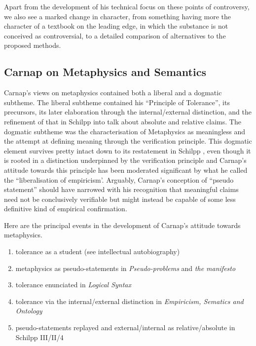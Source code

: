 \documentclass[10pt,titlepage]{book}
\begin{document}
Apart from the development of his technical focus on these points of controversy, we also see a marked change in character, from something having more the character of a textbook on the leading edge, in which the substance is not conceived as controversial, to a detailed comparison of alternatives to the proposed methods.

\subsection{Carnap on Metaphysics and Semantics}

Carnap's views on metaphysics contained both a liberal and a dogmatic subtheme.
The liberal subtheme contained his ``Principle of Tolerance'', its precursors, its later elaboration through the internal/external distinction, and the refinement of that in Schilpp\cite{carnap63a} into talk about absolute and relative claims.
The dogmatic subtheme was the characterisation of Metaphysics as meaningless and the attempt at defining meaning through the verification principle.
This dogmatic element survives pretty intact down to its restatement in Schilpp \cite{carnap63a}, even though it is rooted in a distinction underpinned by the verification principle and Carnap's attitude towards this principle has been moderated significant by what he called the ``liberalisation of empiricism'.
Arguably, Carnap's conception of ``pseudo statement'' should have narrowed with his recognition that meaningful claims need not be conclusively verifiable but might instead be capable of some less definitive kind of empirical confirmation.

Here are the principal events in the development of Carnap's attitude towards metaphysics.

\begin{enumerate}
\item tolerance as a student (see intellectual autobiography)
\item metaphysics as pseudo-statements in {\it Pseudo-problems} and {\it the manifesto} \cite{carnap28b,carnap29b}
\item tolerance enunciated in {\it Logical Syntax}\cite{carnap34,carnap37}
\item tolerance via the internal/external distinction in {\it Empiricism, Sematics and Ontology} \cite{carnap50}
\item pseudo-statements replayed and external/internal as relative/absolute in Schilpp \cite{carnap63a} III/II/4 
\end{enumerate}
\end{document}
